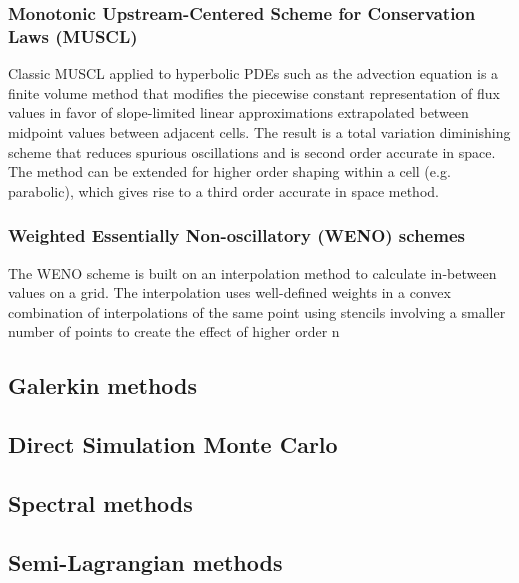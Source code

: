 \documentclass[11pt,titlepage]{report}
\begin{document}
\subsubsection*{Monotonic Upstream-Centered Scheme for Conservation Laws (MUSCL)}

\indent \indent Classic MUSCL applied to hyperbolic PDEs such as the advection equation is a finite volume method that modifies the piecewise constant representation of flux values in favor of slope-limited linear approximations extrapolated between midpoint values between adjacent cells. The result is a total variation diminishing scheme that reduces spurious oscillations and is second order accurate in space. The method can be extended for higher order shaping within a cell (e.g. parabolic), which gives rise to a third order accurate in space method.


\subsubsection*{Weighted Essentially Non-oscillatory (WENO) schemes}

\indent \indent The WENO scheme is built on an interpolation method to calculate in-between values on a grid. The interpolation uses well-defined weights in a convex combination of interpolations of the same point using stencils involving a smaller number of points to create the effect of higher order n

\subsection*{Galerkin methods}



\subsection*{Direct Simulation Monte Carlo}

\subsection*{Spectral methods}



\subsection*{Semi-Lagrangian methods}
\end{document}
